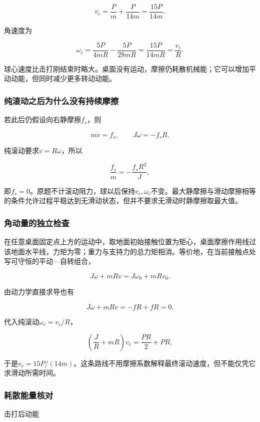 \documentclass[12pt,a4paper,fontset=fandol]{ctexart}
\begin{document}
\[
v_c=\frac Pm+\frac P{14m}
=\boxed{\frac{15P}{14m}}.
\]

角速度为

\[
\omega_c=\frac{5P}{4mR}
-\frac{5P}{28mR}
=\frac{15P}{14mR}
=\frac{v_c}{R}.
\]

球心速度比击打刚结束时略大。桌面没有运动，摩擦仍耗散机械能；它可以增加平动动能，但同时减少更多转动动能。

\subsubsection{纯滚动之后为什么没有持续摩擦}\label{ux7eafux6edaux52a8ux4e4bux540eux4e3aux4ec0ux4e48ux6ca1ux6709ux6301ux7eedux6469ux64e6}

若此后仍假设向右静摩擦\(f_s\)，则

\[
m\dot v=f_s,\qquad J\dot\omega=-f_sR.
\]

纯滚动要求\(\dot v=R\dot\omega\)，所以

\[
\frac{f_s}{m}=-\frac{f_sR^2}{J},
\]

即\(f_s=0\)。原题不计滚动阻力，球以后保持\(v_c,\omega_c\)不变。最大静摩擦与滑动摩擦相等的条件允许过程平稳达到无滑动状态，但并不要求无滑动时静摩擦取最大值。

\subsubsection{角动量的独立检查}\label{ux89d2ux52a8ux91cfux7684ux72ecux7acbux68c0ux67e5}

在任意桌面固定点上方的运动中，取地面初始接触位置为矩心，桌面摩擦作用线过该地面水平线，力矩为零；重力与支持力的总力矩相消。等价地，在当前接触点处写可守恒的平动---自转组合，

\[
J\omega+mRv
=J\omega_0+mRv_0.
\]

由动力学直接求导也有

\[
J\dot\omega+mR\dot v
=-fR+fR=0.
\]

代入纯滚动\(\omega_c=v_c/R\)，

\[
\left(\frac JR+mR\right)v_c
=\frac{PR}{2}+PR,
\]

于是\(v_c=15P/(14m)\)。这条路线不用摩擦系数解释最终滚动速度，但不能仅凭它求滑动所需时间。

\subsubsection{耗散能量核对}\label{ux8017ux6563ux80fdux91cfux6838ux5bf9}

击打后动能
\end{document}
